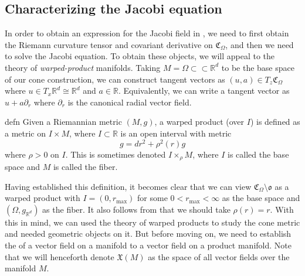 \documentclass[11pt]{article}
\newcommand{\man}{M}
\begin{document}
\subsection{Characterizing the Jacobi equation}

In order to obtain an expression for the Jacobi field in , we need to first obtain the Riemann curvature tensor and covariant derivative on $\mathfrak{C}_\Omega$, and then we need to solve the Jacobi equation. To obtain these objects, we will appeal to the theory of \textit{warped-product} manifolds.
Taking $\man = \Omega \subset \subset \mathbb{R}^d$ to be the base space of our cone construction, we can construct tangent vectors as $(u, a) \in T_{z}\mathfrak{C}_\Omega$ where $u \in T_x\mathbb{R}^d \cong \mathbb{R}^d$ and $a \in \mathbb{R}$. Equivalently, we can write a tangent vector as $u + a\partial_r$ where $\partial_r$ is the canonical radial vector field. 
 
\begin{restatable}{defn}{}
    Given a Riemannian metric $(\man, g)$, a warped product (over $I$) is defined as a metric on $I \times \man$, where $I \subset \mathbb{R}$ is an open interval with metric 
    \[g = dr^2 + \rho^2(r)g\]
    where $\rho > 0$ on $I$. This is sometimes denoted $I \times_{\rho} \man$, where $I$ is called the base space and $\man$ is called the fiber.
\end{restatable}
Having established this definition, it becomes clear that we can view $\mathfrak{C}_\Omega \setminus \mathfrak{o}$ as a warped product with $I = (0, r_{\max})$ for some $0 < r_{\max} <\infty $ as the base space and $(\Omega, g_{\mathbb{R}^d})$ as the fiber. It also follows from  that we should take $\rho(r) = r$. With this in mind, we can used the theory of warped products to study the cone metric and needed geometric objects on it. But before moving on, we need to establish the  of a vector field on a manifold to a vector field on a product manifold. Note that we will henceforth denote $\mathfrak{X}(\man)$ as the space of all vector fields over the manifold $\man$. 
\end{document}

